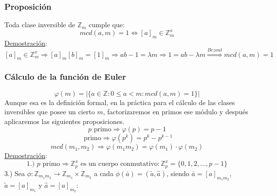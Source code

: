 \documentclass[10pt,a4paper,openright]{book}
\begin{document}
\subsubsection*{Proposición}
Toda clase inversible de $\mathbb Z_m$ cumple que:
$$mcd(a,m)=1 \Leftrightarrow [a]_m\in \mathbb Z_m^x$$
\underline{Demostración}:
$$[a]_m\in \mathbb Z_m^x \Rightarrow [a]_m[b]_m=[1]_m\Rightarrow ab-1=\lambda m\Rightarrow 1=ab-\lambda m\stackrel{Bezout}{\Rightarrow }mcd(a,m)=1$$

\subsubsection*{Cálculo de la función de Euler}
$$\varphi(m)=|\{a\in \mathbb Z : 0\leq a<m : mcd(a,m)=1\}|$$
Aunque esa es la definición formal, en la práctica para el cálculo de las clases inversibles que posee un cierto $m$, factorizaremos en primos ese módulo y después aplicaremos las siguientes proposiciones.\begin{equation}p \mbox{ primo} \Rightarrow \varphi(p)=p-1
\end{equation}
\begin{equation}\mbox{ primo} \Rightarrow \varphi(p^k)=p^k-p^{k-1}
\end{equation}
\begin{equation}mcd(m_1,m_2)\Rightarrow \varphi(m_1m_2)=\varphi(m_1)\cdot \varphi(m_2)
\end{equation}
\underline{Demostración}:
$$\mbox{1.) }
p \mbox{ primo} \Rightarrow \mathbb Z_p^x\mbox{ es un cuerpo conmutativo} : \mathbb Z_p^x=\{0,1,2,...,p-1\}$$
\vspace{0.25cm}
3.) Sea $\phi: \mathbb Z_{m_1m_2}\rightarrow \mathbb Z_{m_1} \times \mathbb Z_{m_2}$ a cada $\phi(\bar{a})=(\tilde{a},\hat{a})$, siendo $\bar{a}=[a]_{m_1m_2}$, $\tilde{a}=[a]_{m_1}$ y $\hat{a}=[a]_{m_2}$:
\end{document}
